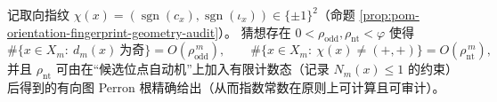 \begin{conjecture}\label{conj:pom-nontrivial-orientation-sector-perron-root}
记取向指纹 \(\chi(x)=(\operatorname{sgn}(c_x),\operatorname{sgn}(\iota_x))\in\{\pm 1\}^2\)（命题 \ref{prop:pom-orientation-fingerprint-geometry-audit}）。
猜想存在 \(0<\rho_{\mathrm{odd}},\rho_{\mathrm{nt}}<\varphi\) 使得
\[
\#\{x\in X_m:\ d_m(x)\ \text{为奇}\}=O(\rho_{\mathrm{odd}}^{\,m}),
\qquad
\#\{x\in X_m:\ \chi(x)\neq(+,+)\}=O(\rho_{\mathrm{nt}}^{\,m}),
\]
并且 \(\rho_{\mathrm{nt}}\) 可由在“候选位点自动机”上加入有限计数态（记录 \(N_m(x)\le 1\) 的约束）后得到的有向图 Perron 根精确给出（从而指数常数在原则上可计算且可审计）。
\end{conjecture}

\endinput
